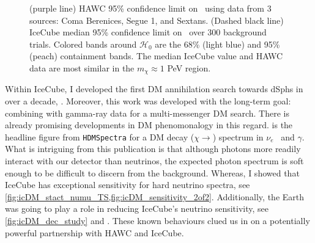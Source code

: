 \begin{figure}[t]
    \caption{(purple line) HAWC 95\% confidence limit on \sv~using data from 3 sources: Coma Berenices, Segue 1, and Sextans. (Dashed black line) IceCube median 95\% confidence limit on \sv~over 300 background trials. Colored bands around $\mathcal{H}_0$ are the 68\% (light blue) and 95\% (peach) containment bands. The median IceCube value and HAWC data are most similar in the $m_\chi \approx 1$ PeV region.}
    \label{fig:nuDuck_sens}
\end{figure}

Within IceCube, I developed the first DM annihilation search towards dSphs in over a decade, .
Moreover, this work was developed with the long-term goal: combining with gamma-ray data for a multi-messenger DM search.
There is already promising developments in DM phenomonalogy in this regard.
 is the headline figure from \texttt{HDMSpectra} \cite{HDMSpectra} for a DM decay ($\chi \rightarrow$) spectrum in $\nu_e$~ and $\gamma$.
What is intriguing from this publication is that although photons more readily interact with our detector than neutrinos, the expected photon spectrum is soft enough to be difficult to discern from the background.
Whereas, I showed that IceCube has exceptional sensitivity for hard neutrino spectra, see \cref{fig:icDM_stact_numu_TS,fig:icDM_sensitivity_2of2}.
Additionally, the Earth was going to play a role in reducing IceCube's neutrino sensitivity, see \cref{fig:icDM_dec_study} and \cite{IC3:Earth_Attenuation}.
These known behaviours clued us in on a potentially powerful partnership with HAWC and IceCube.

